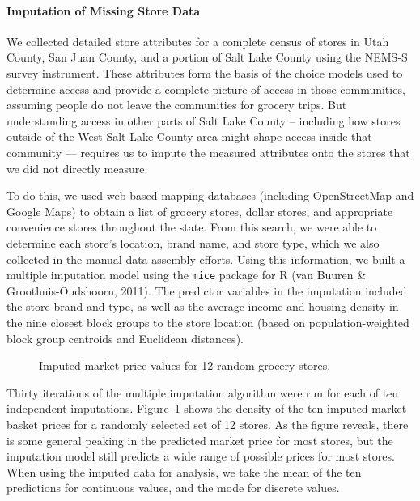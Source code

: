 \documentclass[
  letterpaper,
  number,
  review,
  3p]{elsarticle}
\let\oldparagraph\paragraph
\renewcommand{\paragraph}[1]{\oldparagraph{#1}\mbox{}}
\begin{document}
\paragraph{Imputation of Missing Store
Data}\label{imputation-of-missing-store-data}

We collected detailed store attributes for a complete census of stores
in Utah County, San Juan County, and a portion of Salt Lake County using
the NEMS-S survey instrument. These attributes form the basis of the
choice models used to determine access and provide a complete picture of
access in those communities, assuming people do not leave the
communities for grocery trips. But understanding access in other parts
of Salt Lake County -- including how stores outside of the West Salt
Lake County area might shape access inside that community --- requires
us to impute the measured attributes onto the stores that we did not
directly measure.

To do this, we used web-based mapping databases (including OpenStreetMap
and Google Maps) to obtain a list of grocery stores, dollar stores, and
appropriate convenience stores throughout the state. From this search,
we were able to determine each store's location, brand name, and store
type, which we also collected in the manual data assembly efforts. Using
this information, we built a multiple imputation model using the
\texttt{mice} package for R (van Buuren \& Groothuis-Oudshoorn, 2011).
The predictor variables in the imputation included the store brand and
type, as well as the average income and housing density in the nine
closest block groups to the store location (based on population-weighted
block group centroids and Euclidean distances).

\begin{figure}


\caption{\label{fig-marketimp}Imputed market price values for 12 random
grocery stores.}

\end{figure}%

Thirty iterations of the multiple imputation algorithm were run for each
of ten independent imputations. Figure~\ref{fig-marketimp} shows the
density of the ten imputed market basket prices for a randomly selected
set of 12 stores. As the figure reveals, there is some general peaking
in the predicted market price for most stores, but the imputation model
still predicts a wide range of possible prices for most stores. When
using the imputed data for analysis, we take the mean of the ten
predictions for continuous values, and the mode for discrete values.
\end{document}
